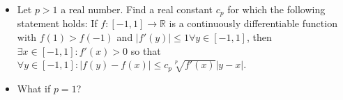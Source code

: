 \begin{itemize}
\item[(a)] Let \(p>1\) a real number. Find a real constant \(c_p\) for which the following statement holds:
If \(f\colon  [-1,1]\to\mathbb{R}\) is a continuously differentiable function with \(f(1)>f(-1)\) and \(|f'(y)|\le1 \forall y\in[-1,1]\), then \(\exists x\in[-1,1]: f'(x)>0\) so that \(\forall y\in[-1,1]: |f(y)-f(x)|\le c_p\sqrt[p]{f'(x)}|y-x|\).

\item[(b)] What if \(p=1\)?
\end{itemize}
